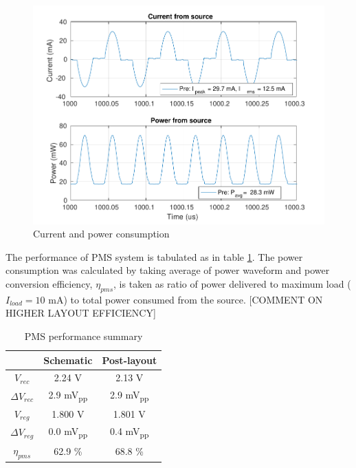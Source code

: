 \documentclass[12pt,a4paper,UKenglish]{article}
\begin{document}
\begin{figure} [H]
  \centering
  \includegraphics[width=\textwidth]{img/pms/pms_PI.pdf} 
 \caption{Current and power consumption} 
\label{fig:pms_PI} 
\end{figure}

The performance of PMS system is tabulated as in table \ref{tab:pms_spec}. The power consumption was calculated by taking average of power waveform and power conversion efficiency, $\eta_{pms}$, is taken as ratio of power delivered to maximum load ($I_{load} = 10$ \si{\milli\ampere}) to total power consumed from the source. [COMMENT ON HIGHER LAYOUT EFFICIENCY] \\

\begin{table}[H]
\caption{PMS performance summary} 
\begin{center}
\begin{tabular}{c|c|c}
\hline \hline
			& \textbf{Schematic}	& \textbf{Post-layout} 	\\
\hline \hline
$V_{rec}$ 			& 2.24 \si{\volt}		& 2.13 V	\\ \hline
$\Delta V_{rec}$	& 2.9 \si{\milli\volt}\textsubscript{pp} & 2.9 \si{\milli\volt}\textsubscript{pp}		\\ \hline
$V_{reg}$			& 1.800	\si{\volt}		& 1.801 \si{\volt}			\\ \hline
$\Delta V_{reg}$ 	& 0.0 \si{\milli\volt}\textsubscript{pp} & 0.4 \si{\milli\volt}\textsubscript{pp}		\\ \hline
$\eta_{pms}$		& 	62.9 \%	& 68.8 \%		\\ 
 
\hline \hline
\end{tabular}
\end{center}
\label{tab:pms_spec}
\end{table}%
\end{document}
